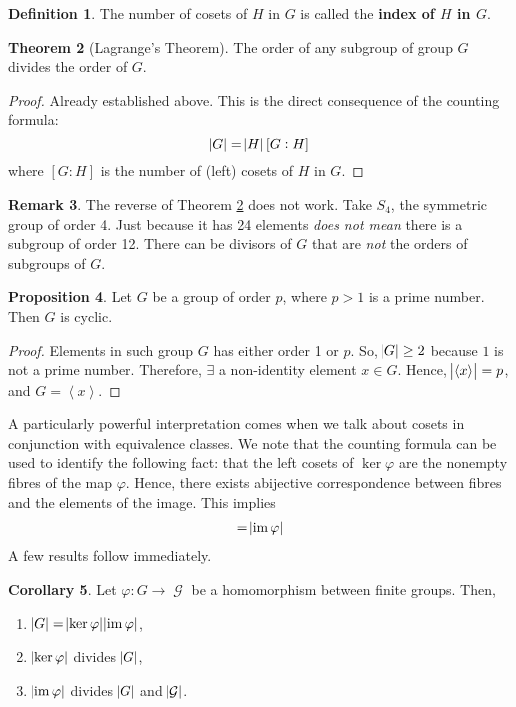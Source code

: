 \documentclass[11pt]{amsart} %
\theoremstyle{definition}
\newtheorem{definition}{Definition}[section]
\newtheorem{proposition}[definition]{Proposition}
\newtheorem{theorem}[definition]{Theorem}
\newtheorem{corollary}[definition]{Corollary}
\theoremstyle{definition}
\newtheorem{remark}[definition]{Remark}
\DeclareMathOperator{\GG}{\mathcal{G}}
\DeclareMathOperator{\im}{im}
\numberwithin{equation}{section}
\newcommand{\cyclic}[1]{\left\langle #1 \right\rangle}
\begin{document}
\begin{definition}
	The number of cosets of $H$ in $G$ is called the \textbf{index of $H$ in $G$}.
\end{definition}

\begin{theorem}[Lagrange's Theorem]
	\label{lagrangethm}
	The order of any subgroup of group $G$ divides the order of $G$.
\end{theorem}

\begin{proof}
	Already established above. This is the direct consequence of the counting formula:
	$$ \abs{G} = \abs{H} [G: H] $$
	where $[G:H]$ is the number of (left) cosets of $H$ in $G$.
\end{proof}

\begin{remark}
	The reverse of Theorem \ref{lagrangethm} does not work. Take $S_4$, the symmetric group of order 4. Just because it has 24 elements \textit{does not mean} there is a subgroup of order 12. There can be divisors of $G$ that are \textit{not} the orders of subgroups of $G$.
\end{remark}

\begin{proposition}
	\label{primecyclic}
	Let $G$ be a group of order $p$, where $p>1$ is a prime number. Then $G$ is cyclic.
\end{proposition}

\begin{proof}
	Elements in such group $G$ has either order 1 or $p$. So, $\abs{G} \geq 2$ because $1$ is not a prime number. Therefore, $\exists $ a non-identity element $x \in G$. Hence, $\abs{\cyclic{x}} = p$, and $G= \cyclic{x} $.
\end{proof}

A particularly powerful interpretation comes when we talk about cosets in conjunction with equivalence classes. We note that the counting formula can be used to identify the following fact: that the left cosets of $\ker \varphi$ are the nonempty fibres of the map $\varphi$. Hence, there exists  abijective correspondence between fibres and the elements of the image. This implies
\begin{align*}
[G:\ker \varphi] = \abs{\im \varphi}
\end{align*}
A few results follow immediately.

\begin{corollary}
	\label{cororderskerimgroupsrelationship}
	Let $\varphi: G \to \GG$ be a homomorphism between finite groups. Then,
	\begin{enumerate}
		\item $\abs{G} = \abs{\ker \varphi} \abs{\im \varphi}$,
		\item $\abs{\ker \varphi}$ divides $\abs{G}$,
		\item $\abs{\im \varphi}$ divides $\abs{G}$ and $\abs{\GG}$.
	\end{enumerate}
\end{corollary}
\end{document}
